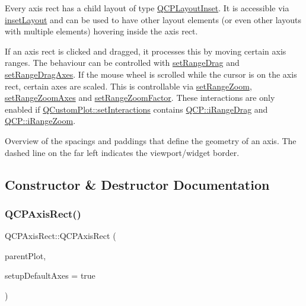 Every axis rect has a child layout of type \hyperlink{classQCPLayoutInset}{Q\+C\+P\+Layout\+Inset}. It is accessible via \hyperlink{classQCPAxisRect_a949f803466619924c7018df4b511ae10}{inset\+Layout} and can be used to have other layout elements (or even other layouts with multiple elements) hovering inside the axis rect.

If an axis rect is clicked and dragged, it processes this by moving certain axis ranges. The behaviour can be controlled with \hyperlink{classQCPAxisRect_ae6aef2f7211ba6097c925dcd26008418}{set\+Range\+Drag} and \hyperlink{classQCPAxisRect_a648cce336bd99daac4a5ca3e5743775d}{set\+Range\+Drag\+Axes}. If the mouse wheel is scrolled while the cursor is on the axis rect, certain axes are scaled. This is controllable via \hyperlink{classQCPAxisRect_a7960a9d222f1c31d558b064b60f86a31}{set\+Range\+Zoom}, \hyperlink{classQCPAxisRect_a9442cca2aa358405f39a64d51eca13d2}{set\+Range\+Zoom\+Axes} and \hyperlink{classQCPAxisRect_a895d7ac745ea614e04056244b3c138ac}{set\+Range\+Zoom\+Factor}. These interactions are only enabled if \hyperlink{classQCustomPlot_a5ee1e2f6ae27419deca53e75907c27e5}{Q\+Custom\+Plot\+::set\+Interactions} contains \hyperlink{namespaceQCP_a2ad6bb6281c7c2d593d4277b44c2b037a2c4432b9aceafb94000be8d1b589ef18}{Q\+C\+P\+::i\+Range\+Drag} and \hyperlink{namespaceQCP_a2ad6bb6281c7c2d593d4277b44c2b037abee1e94353525a636aeaf0ba32b72e14}{Q\+C\+P\+::i\+Range\+Zoom}.

 \begin{center}Overview of the spacings and paddings that define the geometry of an axis. The dashed line on the far left indicates the viewport/widget border.\end{center}  

\subsection{Constructor \& Destructor Documentation}
\mbox{\label{classQCPAxisRect_a60b31dece805462c1b82eea2e69ba042}} 
\subsubsection{\texorpdfstring{Q\+C\+P\+Axis\+Rect()}{QCPAxisRect()}}
{\footnotesize\ttfamily Q\+C\+P\+Axis\+Rect\+::\+Q\+C\+P\+Axis\+Rect (\begin{DoxyParamCaption}\item[{\hyperlink{classQCustomPlot}{Q\+Custom\+Plot} $\ast$}]{parent\+Plot,  }\item[{bool}]{setup\+Default\+Axes = {\ttfamily true} }\end{DoxyParamCaption})\hspace{0.3cm}{\ttfamily [explicit]}}

